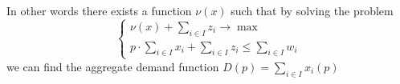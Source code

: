 \documentclass[a4paper, 10pt]{article}
\begin{document}
In other words there exists a function $\nu(x)$ such that by solving the problem
\begin{equation}
    \begin{cases}
        \nu(x)+\sum_{i \in I} z_i \rightarrow \max \\
        p \cdot \sum_{i \in I} x_i+\sum_{i \in I} z_i \leq \sum_{i \in I} w_i
    \end{cases}
\end{equation}
we can find the aggregate demand function $D(p) =\sum_{i\in I}x_i(p)$
\end{document}
